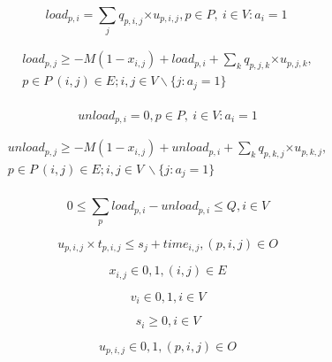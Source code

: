 \begin{equation}
load_{p,i}=\sum_{j}{q_{p,i,j}{\times u}_{p,i,j}}, p\in P,\ i\in V:a_i=1\ 
\label{VRP_8}
\end{equation}

\begin{equation}
\begin{split}
load_{p,j}\geq-M\left(1-x_{i,j}\right)+load_{p,i}+\sum_{k} q_{p,j,k}{\times u}_{p,j,k}, \\
p\in P\ \left(i,j\right)\in E;i,j\in V \backslash \{j:a_j=1\}\\
\end{split}
\label{VRP_9}
\end{equation}

\begin{equation}
unload_{p,i}=0, p\in P,\ i\in V:a_i=1
\label{VRP_10}
\end{equation}

\begin{equation}
\begin{split}
unload_{p,j}\geq-M\left(1-x_{i,j}\right)+unload_{p,i}+\sum_{k} q_{p,k,j}{\times u}_{p,k,j},\\
p\in P\ \left(i,j\right)\in E;i,j\in V\ \backslash \{j:a_j=1\}\\
\end{split}
\label{VRP_11}
\end{equation}

\begin{equation}
0\le\sum_{p}{load_{p,i}-unload_{p,i}\le Q}, i\in V
\label{VRP_12}
\end{equation}

\begin{equation}
u_{p,i,j}\times t_{p,i,j}\le s_j+time_{i,j}, \left(p,i,j\right)\in O
\label{VRP_13}
\end{equation}

\begin{equation}
x_{i,j}\in{0,1}, \left(i,j\right)\in E
\label{VRP_14}
\end{equation}

\begin{equation}
v_i\in{0,1}, i\in V
\label{VRP_15}
\end{equation}

\begin{equation}
s_i\geq0, i\in V
\label{VRP_16}
\end{equation}

\begin{equation}
u_{p,i,j}\in{0,1}, (p,i,j)\in O
\label{VRP_17}
\end{equation}

